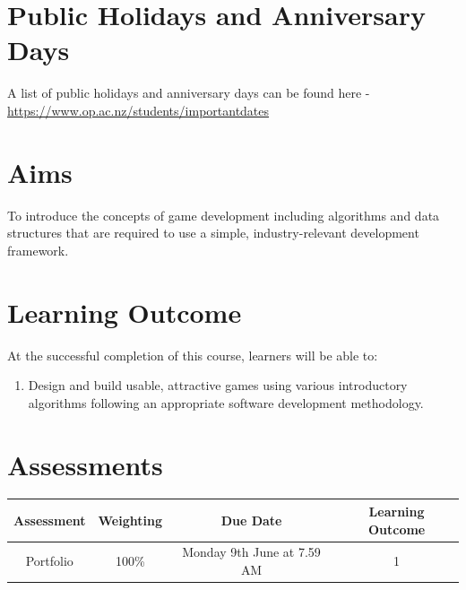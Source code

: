 \documentclass{article}
\begin{document}
\section*{Public Holidays and Anniversary Days}
A list of public holidays and anniversary days can be found here - \href{https://www.op.ac.nz/students/importantdates}{https://www.op.ac.nz/students/importantdates}

\section*{Aims}
To introduce the concepts of game development including algorithms and data structures that are required to use a simple, industry-relevant development framework.

\section*{Learning Outcome}
At the successful completion of this course, learners will be able to:
\begin{enumerate}
	\item Design and build usable, attractive games using various introductory algorithms following an appropriate software development methodology.
\end{enumerate}

\section*{Assessments}
\renewcommand{\arraystretch}{1.5}
\begin{tabular}{|c|c|c|c|}
	\hline
	\textbf{Assessment}                                 & \textbf{Weighting} & \textbf{Due Date}            & \textbf{Learning Outcome} \\ \hline
	\small Portfolio                 & \small 100\%        & \small Monday 9th June at 7.59 AM \small  & \small 1                   \\ \hline
\end{tabular}
\end{document}
